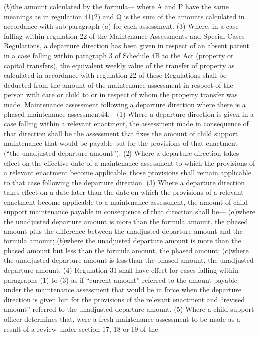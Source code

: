 \documentclass[a4paper]{article}
\begin{document}
($b$)the amount calculated by the formula—
where A and P have the same meanings as in regulation 41(2) and Q is the sum of
the amounts calculated in accordance with sub-paragraph ($a$) for each assessment.
(3) Where, in a case falling within regulation 22 of the Maintenance Assessments
and Special Cases Regulations, a departure direction has been given in respect
of an absent parent in a case falling within paragraph 3 of Schedule 4B to the
Act (property or capital transfers), the equivalent weekly value of the transfer
of property as calculated in accordance with regulation 22 of these Regulations
shall be deducted from the amount of the maintenance assessment in respect of
the person with care or child to or in respect of whom the property transfer was
made.
Maintenance assessment following a departure direction where there is a phased
maintenance assessment44.—(1) Where a departure direction is given in a case
falling within a relevant enactment, the assessment made in consequence of that
direction shall be the assessment that fixes the amount of child support
maintenance that would be payable but for the provisions of that enactment (“the
unadjusted departure amount”).
(2) Where a departure direction takes effect on the effective date of a
maintenance assessment to which the provisions of a relevant enactment become
applicable, those provisions shall remain applicable to that case following the
departure direction.
(3) Where a departure direction takes effect on a date later than the date on
which the provisions of a relevant enactment become applicable to a maintenance
assessment, the amount of child support maintenance payable in consequence of
that direction shall be—
($a$)where the unadjusted departure amount is more than the formula amount, the
phased amount plus the difference between the unadjusted departure amount and
the formula amount;
($b$)where the unadjusted departure amount is more than the phased amount but less
than the formula amount, the phased amount;
($c$)where the unadjusted departure amount is less than the phased amount, the
unadjusted departure amount.
(4) Regulation 31 shall have effect for cases falling within paragraphs (1) to
(3) as if “current amount” referred to the amount payable under the maintenance
assessment that would be in force when the departure direction is given but for
the provisions of the relevant enactment and “revised amount” referred to the
unadjusted departure amount.
(5) Where a child support officer determines that, were a fresh maintenance
assessment to be made as a result of a review under section 17, 18 or 19 of the
\end{document}
